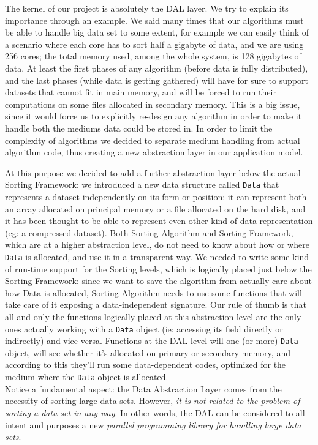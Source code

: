 \label{DAL}
The kernel of our project is absolutely the DAL layer. We try to explain its importance through an example. We said many times that our algorithms must be able to handle big data set to some extent, for example we can easily think of a scenario where each core has to sort half a gigabyte of data, and we are using 256 cores; the total memory used, among the whole system, is 128 gigabytes of data.
At least the first phases of any algorithm (before data is fully distributed), and the last phases (while data is getting gathered) will have for sure to support datasets that cannot fit in main memory, and will be forced to run their computations on some files allocated in secondary memory. 
This is a big issue, since it would force us to explicitly re-design any algorithm in order to make it handle both the mediums data could be stored in.
In order to limit the complexity of algorithms we decided to separate medium handling from actual algorithm code, thus creating a new abstraction layer in our application model.

At this purpose we decided to add a further abstraction layer below the actual Sorting Framework: we introduced a new data structure called \texttt{Data} that represents a dataset independently on its form or position: it can represent both an array allocated on principal memory or a file allocated on the hard disk, and it has been thought to be able to represent even other kind of data representation (eg: a compressed dataset). Both Sorting Algorithm and Sorting Framework, which are at a higher abstraction level, do not need to know about how or where \texttt{Data} is allocated, and use it in a transparent way.
We needed to write some kind of run-time support for the Sorting levels, which is logically placed just below the Sorting Framework: since we want to save the algorithm from actually care about how Data is allocated, Sorting Algorithm needs to use some functions that will take care of it exposing a data-independent signature. Our rule of thumb is that all and only the functions logically placed at this abstraction level are the only ones actually working with a \texttt{Data} object (ie: accessing its field directly or indirectly) and vice-versa.
Functions at the DAL level will one (or more) \texttt{Data} object, will see whether it's allocated on primary or secondary memory, and according to this they'll run some data-dependent codes, optimized for the medium where the \texttt{Data} object is allocated. \\

Notice a fundamental aspect: the Data Abstraction Layer comes from the necessity of sorting large data sets. However, \textit{it is not related to the problem of sorting a data set in any way}. In other words, the DAL can be considered to all intent and purposes a new \textit{parallel programming library for handling large data sets}. 

